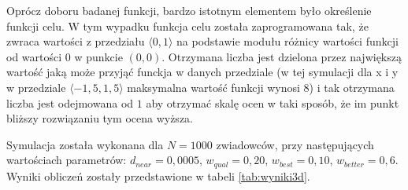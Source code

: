 Oprócz doboru badanej funkcji, bardzo istotnym elementem było określenie funkcji celu. W tym wypadku funkcja celu została zaprogramowana tak, że zwraca wartości z przedziału $\langle 0, 1 \rangle$ na podstawie modułu różnicy wartości funkcji od wartości $0$ w punkcie $(0, 0)$. Otrzymana liczba jest dzielona przez największą wartość jaką może przyjąć funckja w danych przedziale (w tej symulacji dla x i y w przedziale $\langle -1,5, 1,5\rangle$ maksymalna wartość funkcji wynosi $8$) i tak otrzymana liczba jest odejmowana od $1$ aby otrzymać skalę ocen w taki sposób, że im punkt bliższy rozwiązaniu tym ocena wyższa.

Symulacja została wykonana dla $N=1000$ zwiadowców, przy następujących wartościach parametrów: $d_{near} = 0,0005$, $w_{qual} = 0,20$, $w_{best} = 0,10$, $w_{better} = 0,6$. Wyniki obliczeń zostały przedstawione w tabeli \ref{tab:wyniki3d}.

